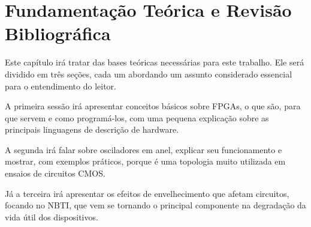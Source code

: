 \chapter{Fundamentação Teórica e Revisão Bibliográfica}
\label{sec:Referencial}

Este capítulo irá tratar das bases teóricas necessárias para este trabalho. Ele será dividido em três seções, cada um abordando um assunto considerado essencial para o entendimento do leitor.

A primeira sessão irá apresentar conceitos básicos sobre FPGAs, o que são, para que servem e como programá-los, com uma pequena explicação sobre as principais linguagens de descrição de hardware.

A segunda irá falar sobre osciladores em anel, explicar seu funcionamento e mostrar, com exemplos práticos, porque é uma topologia muito utilizada em ensaios de circuitos CMOS.

Já a terceira irá apresentar os efeitos de envelhecimento que afetam circuitos, focando no NBTI, que vem se tornando o principal componente na degradação da vida útil dos dispositivos.




